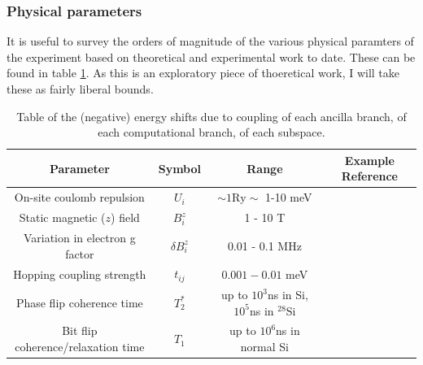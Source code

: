 \documentclass{report}
\begin{document}
\subsubsection{Physical parameters}
It is useful to survey the orders of magnitude of the various physical paramters of the experiment based on theoretical and experimental work to date. These can be found in table \ref{table:parameters}. As this is an exploratory piece of thoeretical work, I will take these as fairly liberal bounds.

\begin{table}
    \centering
\begin{tabular}{|c|c|c|c|}
    \hline
    Parameter & Symbol & Range & Example Reference\\
    \hline
    On-site coulomb repulsion & $U_i$ & $\sim 1\mathrm{Ry} \sim$ 1-10 \unit{\milli\electronvolt} & \cite{Shim2022}\\
    \hline 
    Static magnetic ($z$) field & $B_i^z$ & 1 - 10 \unit{\tesla} & \cite{Jock2018} \\
    \hline
    Variation in electron g factor & $\delta B_i^z$ &0.01 - 0.1 \unit{\mega\hertz} &\cite{Hwang2017} \\
    \hline
    Hopping coupling strength & $t_{ij}$ &$0.001 - 0.01$ \unit{\milli\electronvolt} & \cite{Veldhorst2015} \\
    \hline
    Phase flip coherence time &$ T_2^*$ & up to $10^3$\unit{\nano\second} in Si, $10^5$\unit{\nano\second} in $^{28}$Si & \cite{Loss2022}\\
    \hline
    Bit flip coherence/relaxation time &$T_1$&up to $10^6$\unit{\nano\second} in normal Si& \cite{Loss2022}\\
    \hline

\end{tabular}
\caption{Table of the (negative) energy shifts due to coupling of each ancilla branch, of each computational branch, of each subspace.}\label{table:parameters}
\end{table}
\end{document}
